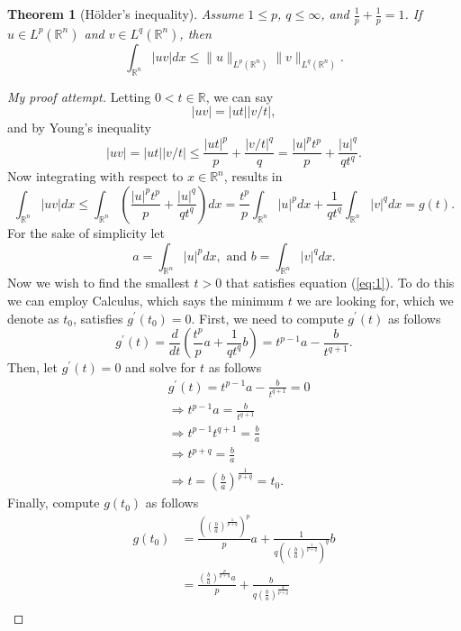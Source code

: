 \documentclass[11pt]{article}
\newtheorem{theorem}{Theorem}
\theoremstyle{definition}
\begin{document}
\begin{theorem}[H\"{o}lder's inequality]
Assume $1 \leq p$, $q \leq \infty$, and $\frac{1}{p} + \frac{1}{p} = 1$. If $u \in L^p(\mathbb{R}^n)$ and $v \in L^q(\mathbb{R}^n)$, then
	\[\int_{\mathbb{R}^n}|uv|dx \leq \|u\|_{L^p(\mathbb{R}^n)}\|v\|_{L^q(\mathbb{R}^n)}.\]
\end{theorem}
\begin{proof}[My proof attempt]
	Letting $0 < t \in \mathbb{R}$, we can say
	\[|uv| = |ut||v/t|,\]
	and by Young's inequality
	\[|uv| = |ut||v/t| \leq \frac{|ut|^p}{p} + \frac{|v/t|^q}{q} = \frac{|u|^pt^p}{p} + \frac{|u|^q}{qt^q}.\]
	Now integrating with respect to $x \in \mathbb{R}^n$, results in
	\begin{equation}
	\label{eq:1}
		\int_{\mathbb{R}^n}|uv|dx \leq  \int_{\mathbb{R}^n}\left(\frac{|u|^pt^p}{p} + \frac{|u|^q}{qt^q}\right)dx
		= \frac{t^p}{p}\int_{\mathbb{R}^n}|u|^pdx + \frac{1}{qt^q}\int_{\mathbb{R}^n}|v|^qdx = g(t).
	\end{equation}
	For the sake of simplicity let
	\[a = \int_{\mathbb{R}^n}|u|^pdx, \text{ and } b = \int_{\mathbb{R}^n}|v|^qdx.\]
	Now we wish to find the smallest $t > 0$ that satisfies equation (\ref{eq:1}). To do this we can employ Calculus, which says the minimum $t$
	we are looking for, which we denote as $t_0$, satisfies $g^{\prime}(t_0) = 0$. First, we need to compute $g^{\prime}(t)$ as follows
	\[g^{\prime}(t) = \frac{d}{dt}\left(\frac{t^p}{p}a + \frac{1}{qt^q}b\right) = t^{p-1}a - \frac{b}{t^{q+1}}.\]
	Then, let $g^{\prime}(t) = 0$ and solve for $t$ as follows
	\begin{equation*}
		\begin{aligned}
			&g^{\prime}(t) = t^{p-1}a - \frac{b}{t^{q+1}} = 0 \\
			&\Rightarrow t^{p-1}a = \frac{b}{t^{q+1}} \\
			&\Rightarrow t^{p-1}t^{q+1} = \frac{b}{a} \\
			&\Rightarrow t^{p+q} = \frac{b}{a} \\
			&\Rightarrow t = \left(\frac{b}{a}\right)^{\frac{1}{p+q}} = t_0.
		\end{aligned}
	\end{equation*}
	Finally, compute $g(t_0)$ as follows
	\begin{equation*}
		\begin{aligned}
			g(t_0) &= \frac{\left(\left(\frac{b}{a}\right)^{\frac{1}{p+q}}\right)^p}{p}a + \frac{1}{q\left(\left(\frac{b}{a}\right)^{\frac{1}{p+q}}\right)^q}b \\
			       &= \frac{\left(\frac{b}{a}\right)^{\frac{p}{p+q}}a}{p} + \frac{b}{q\left(\frac{b}{a}\right)^{\frac{q}{p+q}}} \\

\end{aligned}
\end{equation*}
\end{proof}
\end{document}
